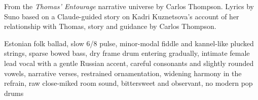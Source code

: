
\begin{notes}
From the \emph{Thomas' Entourage} narrative universe by Carlos Thompson. Lyrics by Suno based on a Claude-guided story on Kadri Kuznetsova's account of her relationship with Thomas, story and guidance by Carlos Thompson.
\end{notes}
\begin{style}
Estonian folk ballad, slow 6/8 pulse, minor-modal fiddle and kannel-like plucked strings, sparse bowed bass, dry frame drum entering gradually, intimate female lead vocal with a gentle Russian accent, careful consonants and slightly rounded vowels, narrative verses, restrained ornamentation, widening harmony in the refrain, raw close-miked room sound, bittersweet and observant, no modern pop drums
\end{style}
